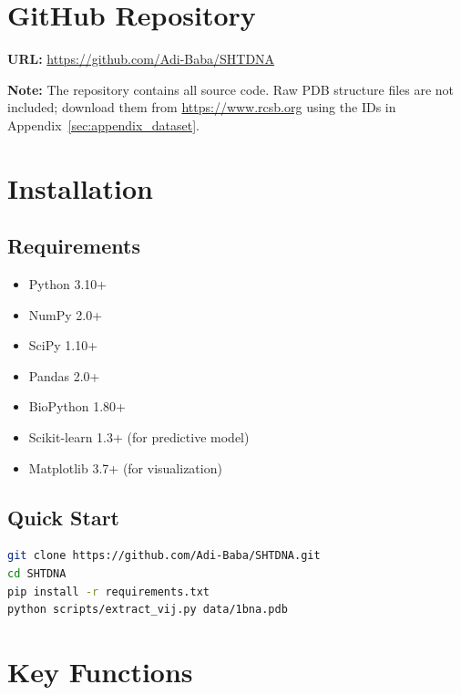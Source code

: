 

\section{GitHub Repository}

\textbf{URL:} \url{https://github.com/Adi-Baba/SHTDNA}

\textbf{Note:} The repository contains all source code. Raw PDB structure files are not included; download them from \url{https://www.rcsb.org} using the IDs in Appendix~\ref{sec:appendix_dataset}.

\section{Installation}

\subsection{Requirements}

\begin{itemize}
    \item Python 3.10+
    \item NumPy 2.0+
    \item SciPy 1.10+
    \item Pandas 2.0+
    \item BioPython 1.80+
    \item Scikit-learn 1.3+ (for predictive model)
    \item Matplotlib 3.7+ (for visualization)
\end{itemize}

\subsection{Quick Start}

\begin{lstlisting}[language=bash]
git clone https://github.com/Adi-Baba/SHTDNA.git
cd SHTDNA
pip install -r requirements.txt
python scripts/extract_vij.py data/1bna.pdb
\end{lstlisting}

\section{Key Functions}

